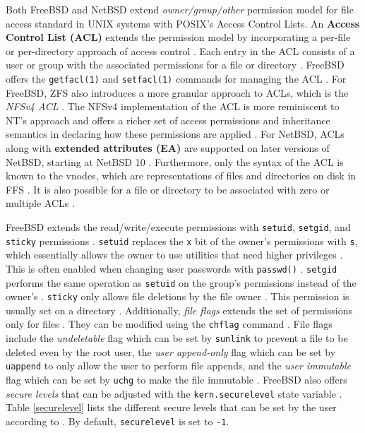 Both FreeBSD and NetBSD extend \textit{owner/group/other} permission model for file access standard in UNIX systems with
POSIX's Access Control Lists. An \textbf{Access Control List (ACL)} extends the permission model by incorporating
a per-file or per-directory approach of access control \parencite{freebsd_security}. Each entry in the ACL consists of a user or group with
the associated permissions for a file or directory \parencite{freebsd_security}. FreeBSD offers the \texttt{getfacl(1)} and \texttt{setfacl(1)}
commands for managing the ACL \parencite{freebsd_security}. For FreeBSD, ZFS also introduces a more granular approach to ACLs,
which is the \textit{NFSv4 ACL} \parencite{oracle_acl2010}. The NFSv4 implementation of the ACL is more reminiscent to
NT's approach and offers a richer set of access permissions and inheritance semantics in declaring how these permissions are
applied \parencite{oracle_acl2010}. For NetBSD, ACLs along with \textbf{extended attributes (EA)} are supported on later versions
of NetBSD, starting at NetBSD 10 \parencite{netbsd_ea_acl}. Furthermore, only the syntax of the ACL is known to the vnodes,
which are representations of files and directories on disk in FFS \parencite{netbsd_acl}. It is also possible for a file or
directory to be associated with zero or multiple ACLs \parencite{netbsd_acl}.

FreeBSD extends the read/write/execute permissions with \texttt{setuid}, \texttt{setgid}, and \texttt{sticky} permissions
\parencite{freebsd_permissions}. \texttt{setuid} replaces the \texttt{x} bit of the owner's permissions with \texttt{s},
which essentially allows the owner to use utilities that need higher privileges \parencite{freebsd_permissions}. This is often
enabled when changing user passwords with \texttt{passwd()} \parencite{freebsd_permissions}. \texttt{setgid} performs the same
operation as \texttt{setuid} on the group's permissions instead of the owner's \parencite{freebsd_permissions}. \texttt{sticky}
only allows file deletions by the file owner \parencite{freebsd_permissions}. This permission is usually set on a directory
\parencite{freebsd_permissions}. Additionally, \textit{file flags} extends the set of permissions only for files \parencite{freebsd_basics}.
They can be modified using the \texttt{chflag} command \parencites{freebsd_basics}{freebsd_chflags}. File flags include
the \textit{undeletable} flag which can be set by \texttt{sunlink} to prevent a file to be deleted even by the root user,
the \textit{user append-only} flag which can be set by \texttt{uappend} to only allow the user to perform file appends,
and the \textit{user immutable} flag which can be set by \texttt{uchg} to make the file immutable \parencite{freebsd_chflags}.
FreeBSD also offers \textit{secure levels} that can be adjusted with the \texttt{kern.securelevel} state variable
\parencite{freebsd_securelevel}. Table \ref{securelevel} lists the different secure levels that can be set by the user according to
\textcite{freebsd_securelevel}. By default, \texttt{securelevel} is set to \texttt{-1}.

